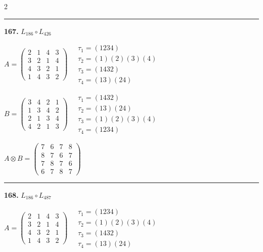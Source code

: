 \begin{multicols}{2}
\vspace{0.3em}
\hrule
\vspace{0.3em}

\noindent\textbf{167.} $L_{186} \circ L_{426}$

$A = \begin{pmatrix} 2 & 1 & 4 & 3 \\ 3 & 2 & 1 & 4 \\ 4 & 3 & 2 & 1 \\ 1 & 4 & 3 & 2 \end{pmatrix} \quad \begin{matrix} \tau_{1}=(1 2 3 4) \\ \tau_{2}=(1)(2)(3)(4) \\ \tau_{3}=(1 4 3 2) \\ \tau_{4}=(1 3)(2 4) \end{matrix}$

$B = \begin{pmatrix} 3 & 4 & 2 & 1 \\ 1 & 3 & 4 & 2 \\ 2 & 1 & 3 & 4 \\ 4 & 2 & 1 & 3 \end{pmatrix} \quad \begin{matrix} \tau_{1}=(1 4 3 2) \\ \tau_{2}=(1 3)(2 4) \\ \tau_{3}=(1)(2)(3)(4) \\ \tau_{4}=(1 2 3 4) \end{matrix}$

$A \otimes B = \begin{pmatrix} 7 & 6 & 7 & 8 \\ 8 & 7 & 6 & 7 \\ 7 & 8 & 7 & 6 \\ 6 & 7 & 8 & 7 \end{pmatrix}$

\vspace{0.3em}
\hrule
\vspace{0.3em}

\noindent\textbf{168.} $L_{186} \circ L_{487}$

$A = \begin{pmatrix} 2 & 1 & 4 & 3 \\ 3 & 2 & 1 & 4 \\ 4 & 3 & 2 & 1 \\ 1 & 4 & 3 & 2 \end{pmatrix} \quad \begin{matrix} \tau_{1}=(1 2 3 4) \\ \tau_{2}=(1)(2)(3)(4) \\ \tau_{3}=(1 4 3 2) \\ \tau_{4}=(1 3)(2 4) \end{matrix}$


\end{multicols}
